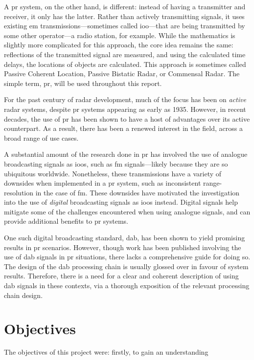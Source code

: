 \documentclass[class=report,11pt,crop=false]{standalone}
\begin{document}
A \gls{pr} system, on the other hand, is different: instead of having a transmitter and receiver, it only has the latter. Rather than actively transmitting signals, it uses existing \gls{em} transmissions---sometimes called \gls{ioo}---that are being transmitted by some other operator---a radio station, for example. While the mathematics is slightly more complicated for this approach, the core idea remains the same: reflections of the transmitted signal are measured, and using the calculated time delays, the locations of objects are calculated. This approach is sometimes called Passive Coherent Location, Passive Bistatic Radar, or Commensal Radar. The simple term, \gls{pr}, will be used throughout this report.

For the past century of radar development, much of the focus has been on \emph{active} radar systems, despite \gls{pr} systems appearing as early as 1935. However, in recent decades, the use of \gls{pr} has been shown to have a host of advantages over its active counterpart. As a result, there has been a renewed interest in the field, across a broad range of use cases.

A substantial amount of the research done in \gls{pr} has involved the use of analogue broadcasting signals as \gls{ioo}s, such as \gls{fm} signals---likely because they are so ubiquitous worldwide. Nonetheless, these transmissions have a variety of downsides when implemented in a \gls{pr} system, such as inconsistent range-resolution in the case of \gls{fm}. These downsides have motivated the investigation into the use of \emph{digital} broadcasting signals as \gls{ioo}s instead. Digital signals help mitigate some of the challenges encountered when using analogue signals, and can provide additional benefits to \gls{pr} systems.

One such digital broadcasting standard, \gls{dab}, has been shown to yield promising results in \gls{pr} scenarios. However, though work has been published involving the use of \gls{dab} signals in \gls{pr} situations, there lacks a comprehensive guide for doing so. The design of the \gls{dab} processing chain is usually glossed over in favour of system results. Therefore, there is a need for a clear and coherent description of using \gls{dab} signals in these contexts, via a thorough exposition of the relevant processing chain design.

\section{Objectives}
The objectives of this project were: firstly, to gain an understanding
\end{document}
